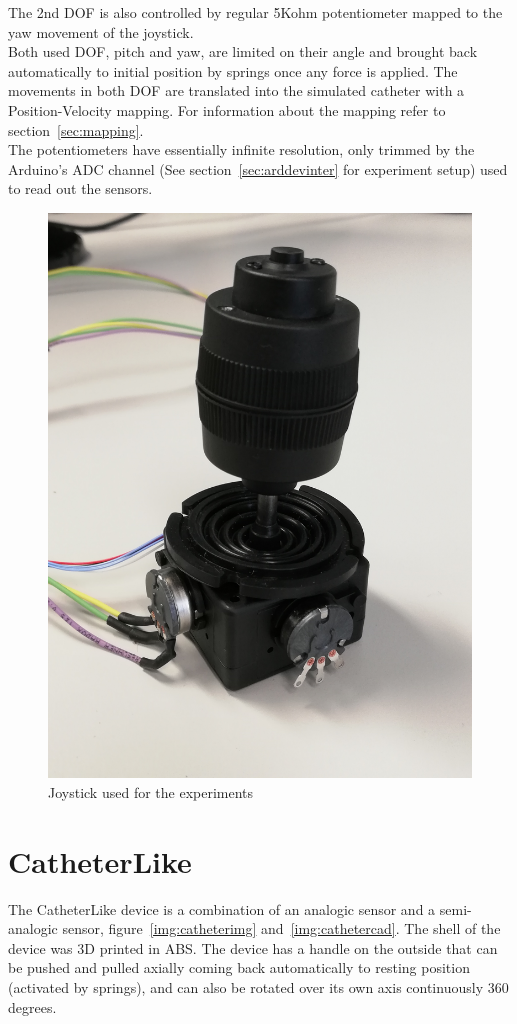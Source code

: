 The 2nd DOF is also controlled by regular 5Kohm potentiometer mapped to the yaw movement of the joystick.\\

Both used DOF, pitch and yaw, are limited on their angle and brought back automatically to initial position by springs once any force is applied. The movements in both DOF are translated into the simulated catheter with a Position-Velocity mapping. For information about the mapping refer to section~\ref{sec:mapping}. \\

The potentiometers have essentially infinite resolution, only trimmed by the Arduino's ADC channel (See section~\ref{sec:arddevinter} for experiment setup) used to read out the sensors.\\

\begin{figure}[ht]
   \centering
   \includegraphics[width=0.6\linewidth]{img/joystick.jpg}
   \caption{Joystick used for the experiments}
   \label{img:joystickimg}
\end{figure}

\section{CatheterLike}\label{sec:catheterlike}
The CatheterLike device is a combination of an analogic sensor and a semi-analogic sensor, figure~\ref{img:catheterimg} and~\ref{img:cathetercad}. The shell of the device was 3D printed in ABS. The device has a handle on the outside that can be pushed and pulled axially coming back automatically to resting position (activated by springs), and can also be rotated over its own axis continuously 360 degrees.\\


